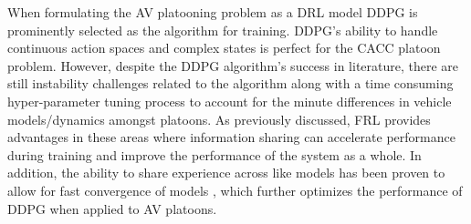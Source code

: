 When formulating the AV platooning problem as a DRL model DDPG is prominently selected
as the algorithm for training.  DDPG's ability to handle continuous action spaces and
complex states is perfect for the CACC platoon problem.  However, despite the DDPG
algorithm's success in literature, there are still instability challenges related to
the algorithm along with a time consuming hyper-parameter tuning process to account
for the minute differences in vehicle models/dynamics amongst platoons. As previously
discussed, FRL provides advantages in these areas where information sharing can accelerate
performance during training and improve the performance of the system as a whole. In
addition, the ability to share experience across like models has been proven to allow
for fast convergence of models \cite{Lim2020}, which further optimizes the performance
of DDPG when applied to AV platoons.